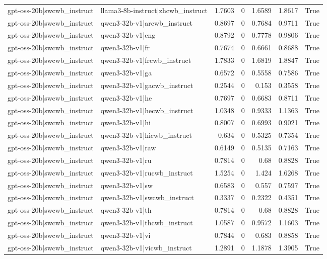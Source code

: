 \begin{table}
\begin{tabular}{l l r r r r l}
gpt-oss-20b|swcwb_instruct & llama3-8b-instruct|zhcwb_instruct & 1.7603 & 0 & 1.6589 & 1.8617 & True \\
gpt-oss-20b|swcwb_instruct & qwen3-32b-v1|arcwb_instruct & 0.8697 & 0 & 0.7684 & 0.9711 & True \\
gpt-oss-20b|swcwb_instruct & qwen3-32b-v1|eng & 0.8792 & 0 & 0.7778 & 0.9806 & True \\
gpt-oss-20b|swcwb_instruct & qwen3-32b-v1|fr & 0.7674 & 0 & 0.6661 & 0.8688 & True \\
gpt-oss-20b|swcwb_instruct & qwen3-32b-v1|frcwb_instruct & 1.7833 & 0 & 1.6819 & 1.8847 & True \\
gpt-oss-20b|swcwb_instruct & qwen3-32b-v1|ga & 0.6572 & 0 & 0.5558 & 0.7586 & True \\
gpt-oss-20b|swcwb_instruct & qwen3-32b-v1|gacwb_instruct & 0.2544 & 0 & 0.153 & 0.3558 & True \\
gpt-oss-20b|swcwb_instruct & qwen3-32b-v1|he & 0.7697 & 0 & 0.6683 & 0.8711 & True \\
gpt-oss-20b|swcwb_instruct & qwen3-32b-v1|hecwb_instruct & 1.0348 & 0 & 0.9333 & 1.1363 & True \\
gpt-oss-20b|swcwb_instruct & qwen3-32b-v1|hi & 0.8007 & 0 & 0.6993 & 0.9021 & True \\
gpt-oss-20b|swcwb_instruct & qwen3-32b-v1|hicwb_instruct & 0.634 & 0 & 0.5325 & 0.7354 & True \\
gpt-oss-20b|swcwb_instruct & qwen3-32b-v1|raw & 0.6149 & 0 & 0.5135 & 0.7163 & True \\
gpt-oss-20b|swcwb_instruct & qwen3-32b-v1|ru & 0.7814 & 0 & 0.68 & 0.8828 & True \\
gpt-oss-20b|swcwb_instruct & qwen3-32b-v1|rucwb_instruct & 1.5254 & 0 & 1.424 & 1.6268 & True \\
gpt-oss-20b|swcwb_instruct & qwen3-32b-v1|sw & 0.6583 & 0 & 0.557 & 0.7597 & True \\
gpt-oss-20b|swcwb_instruct & qwen3-32b-v1|swcwb_instruct & 0.3337 & 0 & 0.2322 & 0.4351 & True \\
gpt-oss-20b|swcwb_instruct & qwen3-32b-v1|th & 0.7814 & 0 & 0.68 & 0.8828 & True \\
gpt-oss-20b|swcwb_instruct & qwen3-32b-v1|thcwb_instruct & 1.0587 & 0 & 0.9572 & 1.1603 & True \\
gpt-oss-20b|swcwb_instruct & qwen3-32b-v1|vi & 0.7844 & 0 & 0.683 & 0.8858 & True \\
gpt-oss-20b|swcwb_instruct & qwen3-32b-v1|vicwb_instruct & 1.2891 & 0 & 1.1878 & 1.3905 & True \\

\end{tabular}
\end{table}
